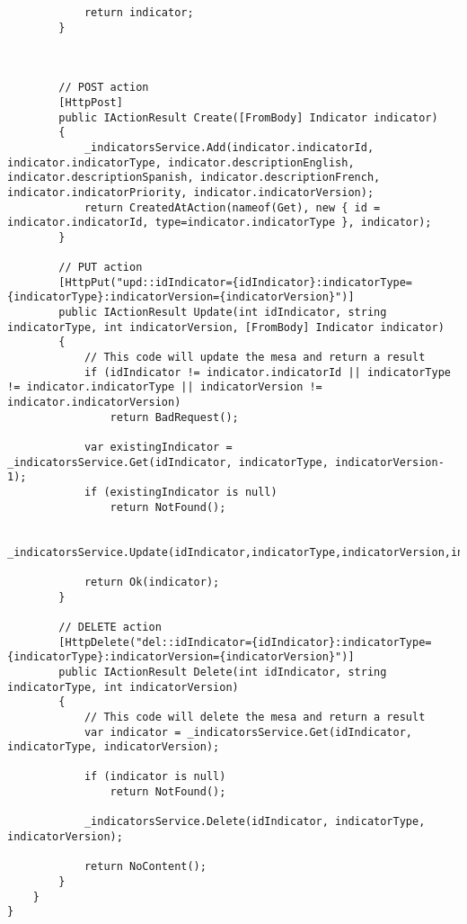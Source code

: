 \begin{itemize}
\begin{itemize}
\begin{lstlisting}
            return indicator;
        }



        // POST action
        [HttpPost]
        public IActionResult Create([FromBody] Indicator indicator)
        {
            _indicatorsService.Add(indicator.indicatorId, indicator.indicatorType, indicator.descriptionEnglish, indicator.descriptionSpanish, indicator.descriptionFrench, indicator.indicatorPriority, indicator.indicatorVersion);
            return CreatedAtAction(nameof(Get), new { id = indicator.indicatorId, type=indicator.indicatorType }, indicator);
        }

        // PUT action
        [HttpPut("upd::idIndicator={idIndicator}:indicatorType={indicatorType}:indicatorVersion={indicatorVersion}")]
        public IActionResult Update(int idIndicator, string indicatorType, int indicatorVersion, [FromBody] Indicator indicator)
        {
            // This code will update the mesa and return a result
            if (idIndicator != indicator.indicatorId || indicatorType != indicator.indicatorType || indicatorVersion != indicator.indicatorVersion)
                return BadRequest();

            var existingIndicator = _indicatorsService.Get(idIndicator, indicatorType, indicatorVersion-1);
            if (existingIndicator is null)
                return NotFound();

            _indicatorsService.Update(idIndicator,indicatorType,indicatorVersion,indicator);

            return Ok(indicator);
        }

        // DELETE action
        [HttpDelete("del::idIndicator={idIndicator}:indicatorType={indicatorType}:indicatorVersion={indicatorVersion}")]
        public IActionResult Delete(int idIndicator, string indicatorType, int indicatorVersion)
        {
            // This code will delete the mesa and return a result
            var indicator = _indicatorsService.Get(idIndicator, indicatorType, indicatorVersion);

            if (indicator is null)
                return NotFound();

            _indicatorsService.Delete(idIndicator, indicatorType, indicatorVersion);

            return NoContent();
        }
    }
}


\end{lstlisting}
\end{itemize}
\end{itemize}
